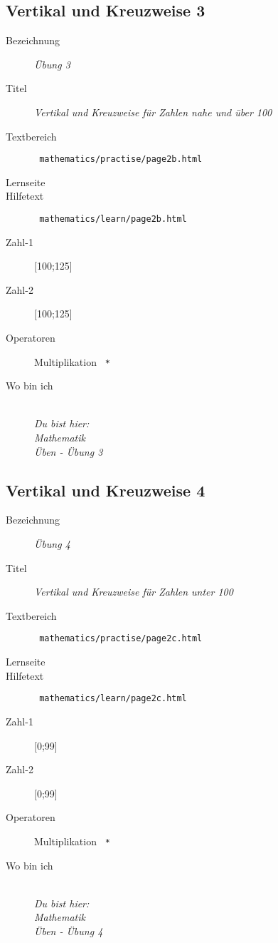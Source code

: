 \subsection{ Vertikal und Kreuzweise 3 }
\label{cha:math-practise-page4}
\begin{description}
  \item[Bezeichnung] \emph{ Übung 3 }
  \item[Titel] \emph{ Vertikal und Kreuzweise für Zahlen nahe und über 100 }
  \item[Textbereich] \texttt{ mathematics/practise/page2b.html }
  \item[Lernseite] 
  \item[Hilfetext] \texttt{ mathematics/learn/page2b.html }
  \item[Zahl-1] [100;125]
  \item[Zahl-2] [100;125]
  \item[Operatoren] Multiplikation \texttt{ * }
  \item[Wo bin ich] \emph{\\Du bist hier:\\Mathematik\\Üben - Übung 3}
\end{description}



\subsection{ Vertikal und Kreuzweise 4 }
\label{cha:math-practise-page5}
\begin{description}
  \item[Bezeichnung] \emph{ Übung 4 }
  \item[Titel] \emph{ Vertikal und Kreuzweise für Zahlen unter 100 }
  \item[Textbereich] \texttt{ mathematics/practise/page2c.html }
  \item[Lernseite] 
  \item[Hilfetext] \texttt{ mathematics/learn/page2c.html }
  \item[Zahl-1] [0;99]
  \item[Zahl-2] [0;99]
  \item[Operatoren] Multiplikation \texttt{ * }
  \item[Wo bin ich] \emph{\\Du bist hier:\\Mathematik\\Üben - Übung 4}
\end{description}



